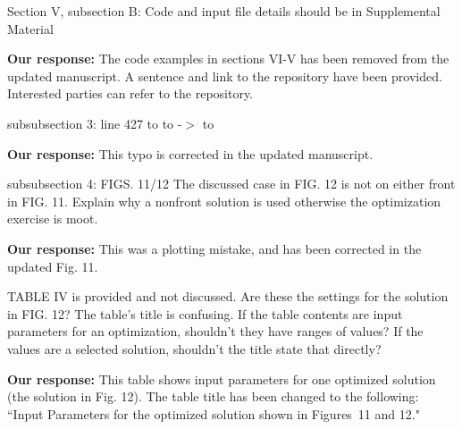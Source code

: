 \documentclass{article}
\begin{document}
Section V, subsection B:
Code and input file details should be in Supplemental Material

{\bf Our response:} {\color{blue} The code examples in sections VI-V has been removed from the updated manuscript. 
	A sentence and link to the repository have been provided. Interested parties can refer to the repository.}

subsubsection 3:
line 427 to to -$>$ to

{\bf Our response:} {\color{blue} This typo is corrected in the updated manuscript.}

subsubsection 4:
FIGS. 11/12 The discussed case in FIG. 12 is not on either front in
FIG. 11. Explain why a nonfront solution is used otherwise the
optimization exercise is moot.

{\bf Our response:} {\color{blue} This was a plotting mistake, and has been corrected in the updated Fig. 11.}

TABLE IV is provided and not discussed. Are these the settings for the
solution in FIG. 12? The table’s title is confusing. If the table
contents are input parameters for an optimization, shouldn’t they have
ranges of values? If the values are a selected solution, shouldn’t the
title state that directly?

{\bf Our response:} {\color{blue} This table shows input parameters for one optimized solution (the solution in Fig. 12). 
The table title has been changed to the following: ``Input Parameters for the optimized solution shown in Figures~11 and 12."}


 
\end{document}
